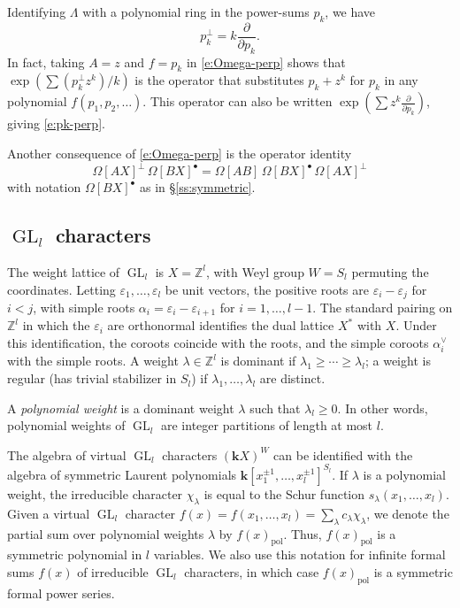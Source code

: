 \documentclass[12pt]{amsart}
\theoremstyle{definition}
\theoremstyle{remark}
\newcommand{\ZZ}{{\mathbb Z}}
\newcommand{\kk}{{\mathbf k}}
\DeclareMathOperator{\pol}{pol}
\DeclareMathOperator{\GL}{GL}
\newcommand{\chek}{^{\vee }}
\begin{document}
Identifying $\Lambda $ with a polynomial ring in the power-sums
$p_{k}$, we have
\begin{equation}\label{e:pk-perp}
p_{k}^{\perp } = k \frac{\partial }{\partial p_{k}}.
\end{equation}
In fact, taking $A = z$ and $f = p_{k}$ in \eqref{e:Omega-perp} shows
that $\exp ( \sum (p_{k}^{\perp } z^{k})/k)$ is the operator that
substitutes $p_{k}+z^{k}$ for $p_{k}$  in any polynomial
$f(p_{1},p_{2},\ldots)$.  This operator can also be written $\exp
(\sum z^{k} \frac{\partial }{\partial p_{k}})$, giving
\eqref{e:pk-perp}.

Another consequence of \eqref{e:Omega-perp} is the operator identity
\begin{equation}\label{e:Omega-perp-Omega}
\Omega [AX]^{\perp }\, \Omega [BX]^{\bullet } = \Omega [AB]\, \Omega
[BX]^{\bullet }\, \Omega [AX]^{\perp }
\end{equation}
with notation $\Omega [BX]^{\bullet }$ as in \S \ref{ss:symmetric}.

\subsection{\texorpdfstring{$\GL_{l}$}{GL\_l} characters}
\label{ss:GL-characters}

The weight lattice of $\GL _{l}$ is $X = \ZZ ^{l}$, with Weyl group $W
= S_{l}$ permuting the coordinates.  Letting $\varepsilon
_{1},\ldots,\varepsilon _{l}$ be unit vectors, the positive roots are
$\varepsilon _{i} - \varepsilon _{j}$ for $i<j$, with simple roots
$\alpha _{i} = \varepsilon _{i} - \varepsilon _{i+1}$ for
$i=1,\ldots,l-1$.  The standard pairing on $\ZZ ^{l}$ in which the
$\varepsilon _{i}$ are orthonormal identifies the dual lattice $X^{*}$
with $X$.  Under this identification, the coroots coincide with the
roots, and the simple coroots $\alpha _{i}\chek $ with the simple
roots.  A weight $\lambda \in \ZZ ^{l}$ is dominant if $\lambda
_{1}\geq \cdots \geq \lambda _{l}$; a weight is regular (has trivial
stabilizer in $S_{l}$) if $\lambda_{1},\ldots,\lambda_{l}$ are
distinct.

A {\em polynomial weight} is a
dominant weight $\lambda $ such that $\lambda _{l}\geq 0$.  In other
words, polynomial weights of $\GL _{l}$ are integer partitions of
length at most $l$.

The algebra of virtual $\GL _{l}$ characters $(\kk X)^{W}$ can be
identified with the algebra of symmetric Laurent polynomials $\kk
[x_{1}^{\pm 1},\ldots,x_{l}^{\pm 1}]^{S_{l}}$.  If $\lambda $ is a
polynomial weight, the irreducible character $\chi _{\lambda }$ is
equal to the Schur function $s_{\lambda }(x_{1},\ldots,x_{l})$.  Given
a virtual $\GL _{l}$ character $f(x)= f(x_1,\dots,x_l)  = \sum _{\lambda }c_{\lambda
}\chi _{\lambda }$, 
we denote the partial sum over polynomial weights
$\lambda $ by $f(x)_{\pol }$.  Thus, $f(x)_{\pol }$ is a symmetric
polynomial in $l$ variables.  We also use this notation for infinite
formal sums $f(x)$ of irreducible $\GL _{l}$ characters, in which case
$f(x)_{\pol }$ is a symmetric formal power series.
\end{document}
